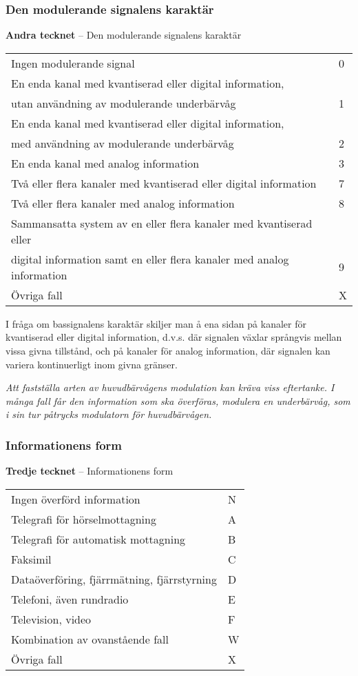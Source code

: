 \subsubsection{Den modulerande signalens karaktär}
\textbf{Andra tecknet} -- Den modulerande signalens karaktär\\
\begin{tabular}{ll}
	Ingen modulerande signal & 0\\
	En enda kanal med kvantiserad eller digital information, &\\
	utan användning av modulerande underbärvåg & 1\\
	En enda kanal med kvantiserad eller digital information, &\\
	med användning av modulerande underbärvåg & 2\\
	En enda kanal med analog information & 3\\
	Två eller flera kanaler med kvantiserad eller digital information & 7\\
	Två eller flera kanaler med analog information & 8\\
	Sammansatta system av en eller flera kanaler med kvantiserad eller & \\
	digital information samt en eller flera kanaler med analog information & 9\\
	Övriga fall & X\\
\end{tabular}

I fråga om bassignalens karaktär skiljer
man å ena sidan på kanaler för kvantiserad eller digital information, d.v.s. där
signalen växlar språngvis mellan vissa givna tillstånd, och på kanaler för
analog information, där signalen kan variera kontinuerligt inom givna gränser.

\emph{Att fastställa arten av huvudbärvågens modulation kan kräva viss
	eftertanke. I många fall får den information som ska överföras, modulera en
	underbärvåg, som i sin tur påtrycks modulatorn för huvudbärvågen.}

\subsubsection{Informationens form}
\textbf{Tredje tecknet} -- Informationens form\\
\begin{tabular}{ll}
	Ingen överförd information & N\\
	Telegrafi för hörselmottagning & A\\
	Telegrafi för automatisk mottagning & B\\
	Faksimil & C\\
	Dataöverföring, fjärrmätning, fjärrstyrning & D\\
	Telefoni, även rundradio & E\\
	Television, video & F\\
	Kombination av ovanstående fall & W\\
	Övriga fall & X\\
\end{tabular}

